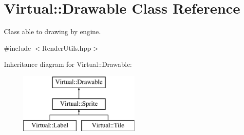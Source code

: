 \hypertarget{class_virtual_1_1_drawable}{}\section{Virtual\+:\+:Drawable Class Reference}
\label{class_virtual_1_1_drawable}


Class able to drawing by engine.  




{\ttfamily \#include $<$Render\+Utils.\+hpp$>$}

Inheritance diagram for Virtual\+:\+:Drawable\+:\begin{figure}[H]
\begin{center}
\leavevmode
\includegraphics[height=3.000000cm]{class_virtual_1_1_drawable}
\end{center}
\end{figure}
